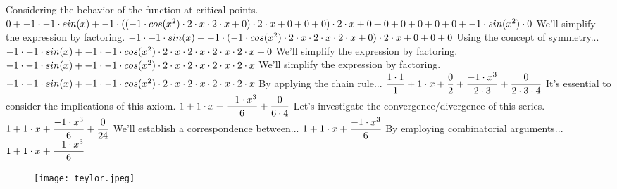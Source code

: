 \documentclass[a4paper, 12pt]{article}
\begin{document}
Considering the behavior of the function at critical points.\newline
$0 + -1 \cdot -1 \cdot  sin( x )  + -1 \cdot  (  ( -1 \cdot  cos(  { x } ^ {\small 2 }  )  \cdot 2 \cdot x \cdot 2 \cdot x + 0 )  \cdot 2 \cdot x + 0 + 0 + 0 )  \cdot 2 \cdot x + 0 + 0 + 0 + 0 + 0 + 0 + -1 \cdot  sin(  { x } ^ {\small 2 }  )  \cdot 0$\newline
We'll simplify the expression by factoring.\newline
$-1 \cdot -1 \cdot  sin( x )  + -1 \cdot  ( -1 \cdot  cos(  { x } ^ {\small 2 }  )  \cdot 2 \cdot x \cdot 2 \cdot x \cdot 2 \cdot x + 0 )  \cdot 2 \cdot x + 0 + 0 + 0$\newline
Using the concept of symmetry...\newline
$-1 \cdot -1 \cdot  sin( x )  + -1 \cdot -1 \cdot  cos(  { x } ^ {\small 2 }  )  \cdot 2 \cdot x \cdot 2 \cdot x \cdot 2 \cdot x \cdot 2 \cdot x + 0$\newline
We'll simplify the expression by factoring.\newline
$-1 \cdot -1 \cdot  sin( x )  + -1 \cdot -1 \cdot  cos(  { x } ^ {\small 2 }  )  \cdot 2 \cdot x \cdot 2 \cdot x \cdot 2 \cdot x \cdot 2 \cdot x$\newline
We'll simplify the expression by factoring.\newline
$-1 \cdot -1 \cdot  sin( x )  + -1 \cdot -1 \cdot  cos(  { x } ^ {\small 2 }  )  \cdot 2 \cdot x \cdot 2 \cdot x \cdot 2 \cdot x \cdot 2 \cdot x$\newline
By applying the chain rule...\newline
$ \dfrac{1 \cdot 1 }{ 1 }  + 1 \cdot x +  \dfrac{0 }{ 2 }  +  \dfrac{-1 \cdot  { x } ^ {\small 3 }  }{ 2 \cdot 3 }  +  \dfrac{0 }{ 2 \cdot 3 \cdot 4 } $\newline
It's essential to consider the implications of this axiom.\newline
$1 + 1 \cdot x +  \dfrac{-1 \cdot  { x } ^ {\small 3 }  }{ 6 }  +  \dfrac{0 }{ 6 \cdot 4 } $\newline
Let's investigate the convergence/divergence of this series.\newline
$1 + 1 \cdot x +  \dfrac{-1 \cdot  { x } ^ {\small 3 }  }{ 6 }  +  \dfrac{0 }{ 24 } $\newline
We'll establish a correspondence between...\newline
$1 + 1 \cdot x +  \dfrac{-1 \cdot  { x } ^ {\small 3 }  }{ 6 } $\newline
By employing combinatorial arguments...\newline
$1 + 1 \cdot x +  \dfrac{-1 \cdot  { x } ^ {\small 3 }  }{ 6 } $\newline
\begin{figure} [!ht]
\begin{flushleft}
\texttt{[image: teylor.jpeg]}
\end{flushleft}
\end{figure}
\end{document}
